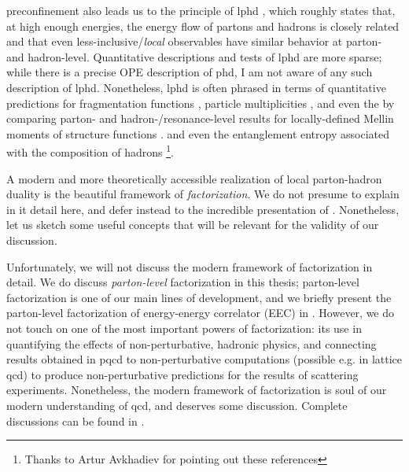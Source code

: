 \Gls{preconfinement} also leads us to  the principle of \gls{lphd} \cite{Azimov:1984np,Dokshitzer:1991eq}, which roughly states that, at high enough energies, the energy flow of partons and hadrons is closely related and that even less-inclusive/\textit{local} observables have similar behavior at parton- and hadron-level.
%
Quantitative descriptions and tests of \gls{lphd} are more sparse;
%
while there is a precise OPE description of \gls{phd}, I am not aware of any such description of \gls{lphd}.
%
Nonetheless, \gls{lphd} is often phrased in terms of quantitative predictions for fragmentation functions \cite{}, particle multiplicities \cite{}, and even the by comparing parton- and hadron-/resonance-level results for locally-defined Mellin moments of structure functions \cite{}.
and even the entanglement entropy associated with the composition of hadrons \cite{}%
\footnote{
    Thanks to Artur Avkhadiev for pointing out these references
}.


A modern and more theoretically accessible realization of local parton-hadron duality is the beautiful framework of \textit{factorization}.
%
We do not presume to explain in it detail here, and defer instead to the incredible presentation of .
%
Nonetheless, let us sketch some useful concepts that will be relevant for the validity of our discussion.


Unfortunately, we will not discuss the modern framework of factorization in detail.
%
We do discuss \textit{parton-level} factorization in this thesis;
%
parton-level  factorization is one of our main lines of development, and we briefly present the parton-level  factorization of energy-energy correlator (EEC) in .
%
However, we do not touch on one of the most important powers of factorization:
%
its use in quantifying the effects of non-perturbative, hadronic physics, and connecting results obtained in \gls{pqcd} to non-perturbative computations (possible e.g. in lattice \gls{qcd}) to produce non-perturbative predictions for the results of scattering experiments.
%
Nonetheless, the modern framework of factorization is soul of our modern understanding of \gls{qcd}, and deserves some discussion.
%
Complete discussions can be found in .


